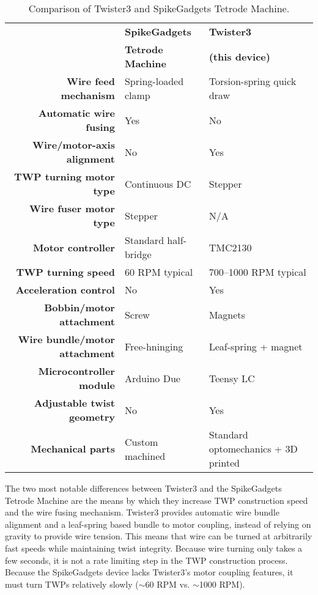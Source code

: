 \documentclass[11pt,a4paper]{article}
\begin{document}
\begin{table}[!htbp]
\centering
\caption{Comparison of Twister3 and SpikeGadgets Tetrode Machine.}
\label{t:compare}

\begin{tabular}{rll}
\toprule
&
\textbf{SpikeGadgets} &
\textbf{Twister3} \\
&
\textbf{Tetrode Machine} &
\textbf{(this device)} \\

\cmidrule{2-3}

\textbf{Wire feed mechanism}            & Spring-loaded clamp   & Torsion-spring quick draw  \\
\textbf{Automatic wire fusing}          & Yes                   & No \\
\textbf{Wire/motor-axis alignment}      & No                    & Yes \\
\textbf{TWP turning motor type}         & Continuous DC         & Stepper \\
\textbf{Wire fuser motor type}          & Stepper               & N/A \\
\textbf{Motor controller}               & Standard half-bridge  & TMC2130 \\
\textbf{TWP turning speed}              & 60 RPM typical        & 700--1000 RPM typical \\
\textbf{Acceleration control}           & No                    & Yes \\
\textbf{Bobbin/motor attachment}        & Screw                 & Magnets \\
\textbf{Wire bundle/motor attachment}   & Free-hninging         & Leaf-spring + magnet \\
\textbf{Microcontroller module}         & Arduino Due           & Teensy LC \\
\textbf{Adjustable twist geometry }     & No                    & Yes \\
\textbf{Mechanical parts}               & Custom machined       & Standard optomechanics + 3D printed \\
\bottomrule
\end{tabular}
\end{table}

The two most notable differences between Twister3 and the SpikeGadgets Tetrode
Machine are the means by which they increase TWP construction speed and the
wire fusing mechanism. Twister3 provides automatic wire bundle alignment and a
leaf-spring based bundle to motor coupling, instead of relying on gravity to
provide wire tension. This means that wire can be turned at arbitrarily fast
speeds while maintaining twist integrity. Because wire turning only takes a few
seconds, it is not a rate limiting step in the TWP construction process.
Because the SpikeGadgets device lacks Twister3's motor coupling features, it
must turn TWPs relatively slowly ($\sim$60 RPM vs. $\sim$1000 RPM).
\end{document}
